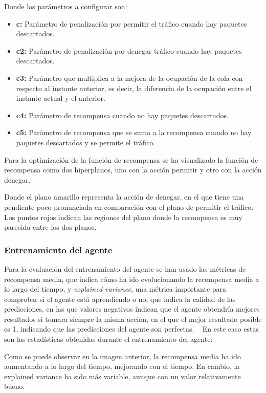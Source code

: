 Donde los parámetros a configurar son:
\begin{itemize}
    \item \textbf{c:} Parámetro de penalización por permitir el tráfico cuando hay paquetes descartados.
    \item \textbf{c2:} Parámetro de penalización por denegar tráfico cuando hay paquetes descartados.
    \item \textbf{c3:} Parámetro que multiplica a la mejora de la ocupación de la cola con respecto al instante anterior, es decir, la diferencia de la ocupación entre el instante actual y el anterior.
    \item \textbf{c4:} Parámetro de recompensa cuando no hay paquetes descartados.
    \item \textbf{c5:} Parámetro de recompensa que se suma a la recompensa cuando no hay paquetes descartados y se permite el tráfico.
\end{itemize}

Para la optimización de la función de recompensa se ha visualizado la función de recompensa como dos hiperplanos, uno con la acción permitir y otro con la acción denegar. 

Donde el plano amarillo representa la acción de denegar, en el que tiene una pendiente poco pronunciada en comparación con el plano de permitir el tráfico.
Los puntos rojos indican las regiones del plano donde la recompensa es muy parecida entre los dos planos.

\subsubsection{Entrenamiento del agente}
Para la evaluación del entrenamiento del agente se han usado las métricas de recompensa media, que indica cómo ha ido evolucionando la recompensa media a lo largo del tiempo, y \textit{explained variance}, una métrica importante para comprobar si el agente está aprendiendo o no, que indica la calidad de las predicciones, en las que valores negativos indican que el agente obtendría mejores resultados si tomara siempre la misma acción, en el que el mejor resultado posible es 1, indicando que las predicciones del agente son perfectas. ~\cite{JonathanHui2023}
En este caso estas son las estadísticas obtenidas durante el entrenamiento del agente:


Como se puede observar en la imagen anterior, la recompensa media ha ido aumentando a lo largo del tiempo, mejorando con el tiempo. En cambio, la explained variance ha sido más variable, aunque con un valor relativamente bueno.

